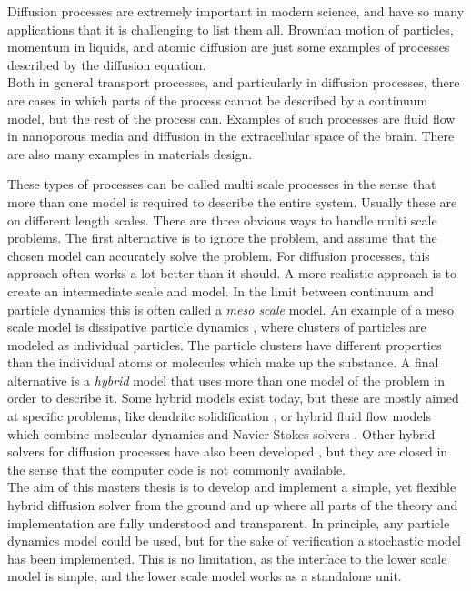 \noindent Diffusion processes are extremely important in modern science, and have so many applications that it is challenging to list them all. 
Brownian motion of particles, momentum in liquids, and atomic diffusion are just some examples of processes described by the diffusion equation. \\
\noindent Both in general transport processes, and particularly in diffusion processes, there are cases in which parts of the process cannot be described by a continuum model, but the rest of the process can. 
Examples of such processes are fluid flow in nanoporous media and diffusion in the extracellular space of the brain. There are also many examples in materials design.

\noindent These types of processes can be called multi scale processes in the sense that more than one model is required to describe the entire system. Usually these are on different length scales. 
There are three obvious ways to handle multi scale problems. 
The first alternative is to ignore the problem, and assume that the chosen model can accurately solve the problem. For diffusion processes, this approach often works a lot better than it should. 
A more realistic approach is to create an intermediate scale and model. In the limit between continuum and particle dynamics this is often called a \emph{meso scale} model. 
An example of a meso scale model is dissipative particle dynamics \cite{warren1998dissipative}, where clusters of particles are modeled as individual particles. The particle clusters have different properties than the individual atoms or molecules which make up the substance. 
A final alternative is a \emph{hybrid} model that uses more than one model of the problem in order to describe it.
Some hybrid models exist today, but these are mostly aimed at specific problems, like dendritc solidification \cite{plapp2000multiscale}, or hybrid fluid flow models which combine molecular dynamics and Navier-Stokes solvers \cite{o1995molecular}. 
Other hybrid solvers for diffusion processes have also been developed \cite{flekkoy2001coupling}, but they are closed in the sense that the computer code is not commonly available. \\

\noindent The aim of this masters thesis is to develop and implement a simple, yet flexible hybrid diffusion solver from the ground and up where all parts of the theory and implementation are fully understood and transparent. 
In principle, any particle dynamics model could be used, but for the sake of verification a stochastic model has been implemented. 
This is no limitation, as the interface to the lower scale model is simple, and the lower scale model works as a standalone unit. \\

